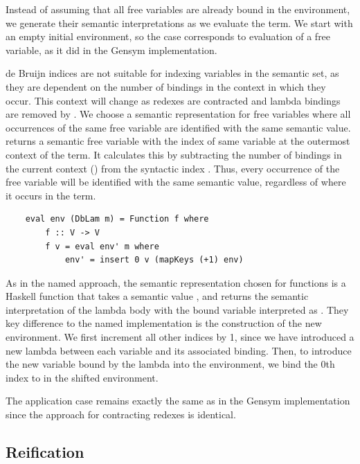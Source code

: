 Instead of assuming that all free variables are already bound in the environment, we generate their semantic interpretations as we evaluate the term. We start with an empty initial environment, so the  case corresponds to evaluation of a free variable, as it did in the Gensym implementation. 


de Bruijn indices are not suitable for indexing variables in the semantic set, as they are dependent on the number of bindings in the context in which they occur. This context will change as redexes are contracted and lambda bindings are removed by . We choose a semantic representation for free variables where all occurrences of the same free variable are identified with the same semantic value.
 returns a semantic free variable with the index of same variable at the outermost context of the term. It calculates this by subtracting the number of bindings in the current context () from the syntactic index . Thus, every occurrence of the free variable will be identified with the same semantic value, regardless of where it occurs in the term. 

\begin{lstlisting}
    eval env (DbLam m) = Function f where
        f :: V -> V
        f v = eval env' m where
            env' = insert 0 v (mapKeys (+1) env)
\end{lstlisting}

As in the named approach, the semantic representation chosen for functions is a Haskell function that takes a semantic value , and returns the semantic interpretation of the lambda body with the bound variable interpreted as . They key difference to the named implementation is the construction of the new environment. We first increment all other indices by 1, since we have introduced a new lambda between each variable and its associated binding. Then, to introduce the new variable bound by the lambda into the environment, we bind the 0th index to  in the shifted environment.

The application case remains exactly the same as in the Gensym implementation since the approach for contracting redexes is identical.

\vspace{\baselineskip}

\subsection{Reification}

